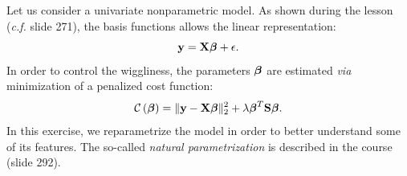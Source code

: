 \documentclass[a4paper,12pt]{article}\usepackage[]{graphicx}\usepackage[]{color}
\def\by{\mathbf{y}}
\def\bbeta{\mbox{\boldmath $\beta$}}
\def\bX{\mathbf{X}}
\def\op{\left(}
\def\cp{\right)}
\begin{document}
      Let us consider a univariate nonparametric model. As shown during the lesson (\textit{c.f.} slide 271), the basis functions allows the linear representation:
        \begin{equation*}
      \by = \bX \bbeta + \mathbf{\epsilon}.
      \end{equation*}
      In order to control the wiggliness, the parameters $\bbeta$ are estimated \textit{via} minimization of a penalized cost function:
      \begin{equation*}
      \mathcal{C}\op\bbeta\cp = \| \by-\bX\bbeta\|_2^2 + \lambda\bbeta^T \mathbf{S}\bbeta \\.
      \end{equation*}
      In this exercise, we reparametrize the model in order to better understand some of its features. The so-called \textit{natural parametrization} is described in the course (slide 292).
\end{document}
